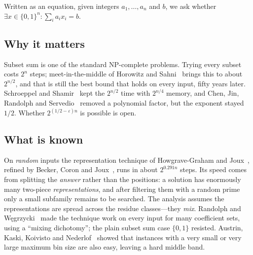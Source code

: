 \documentclass[conference]{IEEEtran}
\begin{document}
Written as an equation, given integers $a_1,\dots,a_n$ and $b$, we ask whether
$\exists x\in\{0,1\}^n:\sum_i a_ix_i=b$.

\subsection{Why it matters}
Subset sum is one of the standard NP-complete problems. Trying every subset costs
$2^n$ steps; meet-in-the-middle of Horowitz and Sahni~\cite{hs} brings this to
about $2^{n/2}$, and that is still the best bound that holds on every input,
fifty years later. Schroeppel and Shamir~\cite{ss} kept the $2^{n/2}$ time with
$2^{n/4}$ memory, and Chen, Jin, Randolph and Servedio~\cite{chen} removed a
polynomial factor, but the exponent stayed $1/2$. Whether $2^{(1/2-\varepsilon)n}$
is possible is open.

\subsection{What is known}
On \emph{random} inputs the representation technique of Howgrave-Graham and
Joux~\cite{hgj}, refined by Becker, Coron and Joux~\cite{bcj}, runs in about
$2^{0.291n}$ steps. Its speed comes from splitting the \emph{answer} rather than
the positions: a solution has enormously many two-piece \emph{representations},
and after filtering them with a random prime only a small subfamily remains to be
searched. The analysis assumes the representations are spread across the residue
classes---they \emph{mix}. Randolph and W\k{e}grzycki~\cite{rw} made the
technique work on every input for many coefficient sets, using a ``mixing
dichotomy''; the plain subset sum case $\{0,1\}$ resisted. Austrin, Kaski,
Koivisto and Nederlof~\cite{akkn} showed that instances with a very small or very
large maximum bin size are also easy, leaving a hard middle band.
\end{document}
